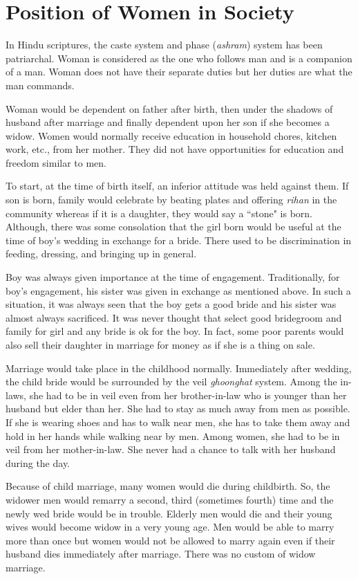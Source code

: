 \chapter{Position of Women in Society}
In Hindu scriptures, the caste system and phase (\textit{ashram}) system has
been patriarchal. Woman is considered as the one who follows man and is a
companion of a man. Woman does not have their separate duties but her duties
are what the man commands.

Woman would be dependent on father after birth, then under the shadows of
husband after marriage and finally dependent upon her son if she becomes a
widow. Women would normally receive education in household chores, kitchen
work, etc., from her mother. They did not have opportunities for education and
freedom similar to men.

To start, at the time of birth itself, an inferior attitude was held against
them. If son is born, family would celebrate by beating plates and offering
\textit{rihan} in the community whereas if it is a daughter, they would say a
``stone" is born. Although, there was some consolation that the girl born would
be useful at the time of boy's wedding in exchange for a bride. There used to
be discrimination in feeding, dressing, and bringing up in general.

Boy was always given importance at the time of engagement. Traditionally, for
boy's engagement, his sister was given in exchange as mentioned above. In such
a situation, it was always seen that the boy gets a good bride and his sister
was almost always sacrificed. It was never thought that select good bridegroom and
family for girl and any bride is ok for the boy. In fact, some poor parents
would also sell their daughter in marriage for money as if she is a thing on
sale.

Marriage would take place in the childhood normally. Immediately after wedding,
the child bride would be surrounded by the veil \textit{ghoonghat} system. Among
the in-laws, she had to be in veil even from her brother-in-law who is younger
than her husband but elder than her. She had to stay as much away from men as
possible. If she is wearing shoes and has to walk near men, she has to take
them away and hold in her hands while walking near by men. Among women, she had
to be in veil from her mother-in-law. She never had a chance to talk with her
husband during the day.

Because of child marriage, many women would die during childbirth. So, the
widower men would remarry a second, third (sometimes fourth) time and the newly
wed bride would be in trouble. Elderly men would die and their young wives
would become widow in a very young age. Men would be able to marry more than
once but women would not be allowed to marry again even if their husband dies
immediately after marriage. There was no custom of widow marriage.

